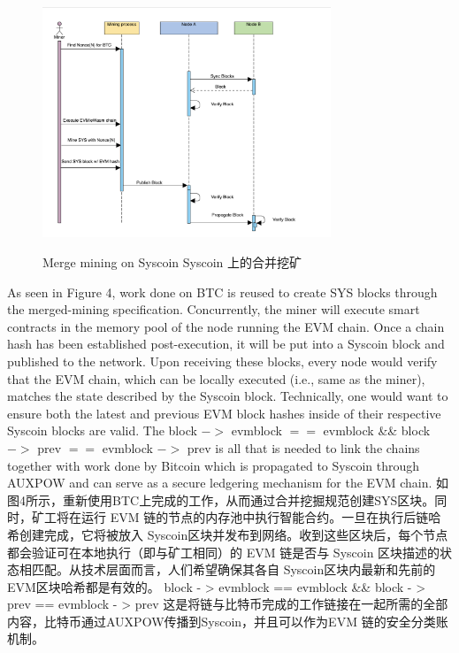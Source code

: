 \documentclass{ctexart}
\begin{document}
\begin{figure}[h!]
\centering
\includegraphics[width=3.4in]{img/fig_6.png}
\label{fig:tech_stack}
\caption{Merge mining on Syscoin Syscoin 上的合并挖矿} 
\end{figure} 

As seen in Figure 4, work done on BTC is reused to create SYS blocks through the merged-mining specification. Concurrently, the miner will execute smart contracts in the memory pool of the node running the EVM chain. Once a chain hash has been established post-execution, it will be put into a Syscoin block and published to the network. Upon receiving these blocks, every node would verify that the EVM chain, which can be locally executed (i.e., same as the miner), matches the state described by the Syscoin block. Technically, one would want to ensure both the latest and previous EVM block hashes inside of their respective Syscoin blocks are valid. The block $->$ evmblock $==$ evmblock \&\& block $->$ prev $==$ evmblock $->$ prev is all that is needed to link the chains together with work done by Bitcoin which is propagated to Syscoin through AUXPOW and can serve as a secure ledgering mechanism for the EVM chain. 如图4所示，重新使用BTC上完成的工作，从而通过合并挖掘规范创建SYS区块。同时，矿工将在运行 EVM 链的节点的内存池中执行智能合约。一旦在执行后链哈希创建完成，它将被放入 Syscoin区块并发布到网络。收到这些区块后，每个节点都会验证可在本地执行（即与矿工相同）的 EVM 链是否与 Syscoin 区块描述的状态相匹配。从技术层面而言，人们希望确保其各自 Syscoin区块内最新和先前的EVM区块哈希都是有效的。 block - > evmblock == evmblock && block - > prev == evmblock - > prev 这是将链与比特币完成的工作链接在一起所需的全部内容，比特币通过AUXPOW传播到Syscoin，并且可以作为EVM 链的安全分类账机制。
\end{document}
